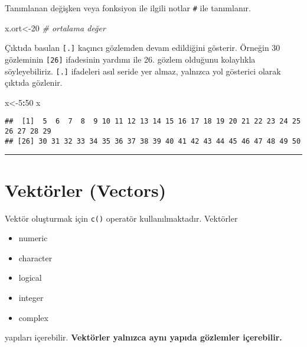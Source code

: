 \documentclass[
]{book}
\newenvironment{Shaded}{\begin{snugshade}}{\end{snugshade}}
\newcommand{\CommentTok}[1]{\textcolor[rgb]{0.56,0.35,0.01}{\textit{#1}}}
\newcommand{\DecValTok}[1]{\textcolor[rgb]{0.00,0.00,0.81}{#1}}
\newcommand{\NormalTok}[1]{#1}
\newcommand{\OperatorTok}[1]{\textcolor[rgb]{0.81,0.36,0.00}{\textbf{#1}}}
\providecommand{\tightlist}{%
  \setlength{\itemsep}{0pt}\setlength{\parskip}{0pt}}
\begin{document}
Tanımlanan değişken veya fonksiyon ile ilgili notlar \texttt{\#} ile tanımlanır.

\begin{Shaded}
\begin{Highlighting}[]
\NormalTok{x.ort<-}\DecValTok{20}  \CommentTok{# ortalama değer}
\end{Highlighting}
\end{Shaded}

Çıktıda basılan \texttt{{[}.{]}} kaçıncı gözlemden devam edildiğini gösterir. Örneğin 30 gözleminin \texttt{{[}26{]}} ifadesinin yardımı ile 26. gözlem olduğunu kolaylıkla söyleyebiliriz. \texttt{{[}.{]}} ifadeleri asıl seride yer almaz, yalnızca yol gösterici olarak çıktıda gözlenir.

\begin{Shaded}
\begin{Highlighting}[]
\NormalTok{x<-}\DecValTok{5}\OperatorTok{:}\DecValTok{50}
\NormalTok{x}
\end{Highlighting}
\end{Shaded}

\begin{verbatim}
##  [1]  5  6  7  8  9 10 11 12 13 14 15 16 17 18 19 20 21 22 23 24 25 26 27 28 29
## [26] 30 31 32 33 34 35 36 37 38 39 40 41 42 43 44 45 46 47 48 49 50
\end{verbatim}

\begin{center}\rule{0.5\linewidth}{0.5pt}\end{center}

\hypertarget{vektuxf6rler-vectors}{%
\section{Vektörler (Vectors)}\label{vektuxf6rler-vectors}}

Vektör oluşturmak için \texttt{c()} operatör kullanılmaktadır. Vektörler

\begin{itemize}
\tightlist
\item
  numeric
\item
  character
\item
  logical
\item
  integer
\item
  complex
\end{itemize}

yapıları içerebilir. \textbf{Vektörler yalnızca aynı yapıda gözlemler içerebilir.}
\end{document}

